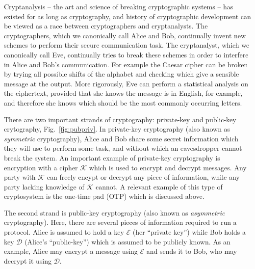 Cryptanalysis -- the art and science of breaking cryptographic systems -- has existed for as long as cryptography, and history of cryptographic development can be viewed as a race between cryptographers and cryptanalysts. The cryptographers, which we canonically call Alice and Bob, continually invent new schemes to perform their secure communication task. The cryptanalyst, which we canonically call Eve, continually tries to break these schemes in order to interfere in Alice and Bob's communication. For example the Caesar cipher can be broken by trying all possible shifts of the alphabet and checking which give a sensible message at the output. More rigorously, Eve can perform a statistical analysis on the ciphertext, provided that she knows the message is in English, for example, and therefore she knows which should be the most commonly occurring letters.


There are two important strands of cryptography: private-key and public-key crytography, Fig.~\ref{fig:pubpriv}. In private-key cryptography (also known as \emph{symmetric} cryptography), Alice and Bob share some secret information which they will use to perform some task, and without which an eavesdropper cannot break the system. An important example of private-key cryptography is encryption with a cipher $\mathcal{K}$ which is used to encrypt and decrypt messages. Any party with $\mathcal{K}$ can freely encypt or decrypt any piece of information, while any party lacking knowledge of $\mathcal{K}$ cannot. A relevant example of this type of cryptosystem is the one-time pad (OTP) which is discussed above.



The second strand is public-key cryptography (also known as \emph{asymmetric} cryptography). Here, there are several pieces of information required to run a protocol. Alice is assumed to hold a key $\mathcal{E}$ (her ``private key'') while Bob holds a key $\mathcal{D}$ (Alice's ``public-key'') which is assumed to be publicly known. As an example, Alice may encrypt a message using $\mathcal{E}$ and sends it to Bob, who may decrypt it using $\mathcal{D}$.  %

